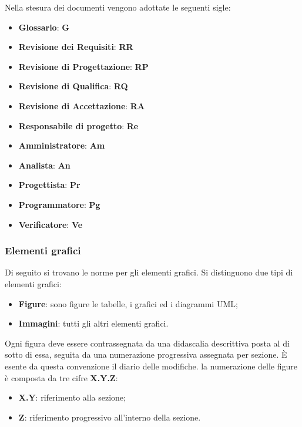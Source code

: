 	    Nella stesura dei documenti vengono adottate le seguenti sigle:
	    \begin{itemize}
	        \item \textbf{Glossario}: \textbf{G}
	        \item \textbf{Revisione dei Requisiti}: \textbf{RR}
	        \item \textbf{Revisione di Progettazione}: \textbf{RP}
	        \item \textbf{Revisione di Qualifica}: \textbf{RQ}
	        \item \textbf{Revisione di Accettazione}: \textbf{RA}
	        \item \textbf{Responsabile di progetto}: \textbf{Re}
	        \item \textbf{Amministratore}: \textbf{Am}
	        \item \textbf{Analista}: \textbf{An}
	        \item \textbf{Progettista}: \textbf{Pr}
	        \item \textbf{Programmatore}: \textbf{Pg}
	        \item \textbf{Verificatore}: \textbf{Ve}
	    \end{itemize}
	    
	    \subsubsection{Elementi grafici}
	    Di seguito si trovano le norme per gli elementi grafici. Si distinguono due tipi di elementi grafici:
	    \begin{itemize}
	        \item \textbf{Figure}: sono figure le tabelle, i grafici ed i diagrammi UML;
	        \item \textbf{Immagini}: tutti gli altri elementi grafici. 
	    \end{itemize}
	    
	    Ogni figura deve essere contrassegnata da una didascalia descrittiva posta al di sotto di essa, seguita da una numerazione progressiva assegnata per sezione. È esente da questa convenzione il diario delle modifiche.
	    la numerazione delle figure è composta da tre cifre \textbf{X.Y.Z}:
	    \begin{itemize}
	        \item \textbf{X.Y}: riferimento alla sezione;
	        \item \textbf{Z}: riferimento progressivo all'interno della sezione.
	    \end{itemize}
	    
